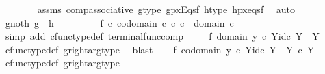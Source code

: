 \begin{isabellebody}
\ \ \ \ \ \ \isamarkupfalse%
\ assms{\isacharparenleft}{\kern0pt}{}{\isacharparenright}{\kern0pt}\ comp{\isacharunderscore}{\kern0pt}associative{}\ g{\isacharunderscore}{\kern0pt}type\ gpx{\isacharunderscore}{\kern0pt}Eqs{\isacharunderscore}{\kern0pt}f\ h{\isacharunderscore}{\kern0pt}type\ hpx{\isacharunderscore}{\kern0pt}eqs{\isacharunderscore}{\kern0pt}f\ \isamarkupfalse%
\ auto\isanewline
\ \ \isamarkupfalse%
\isanewline
\ \ \isamarkupfalse%
\ g{\isacharunderscore}{\kern0pt}not{\isacharunderscore}{\kern0pt}h{\isacharcolon}{\kern0pt}\ {\isachardoublequoteopen}g\ {\isasymnoteq}\ h{\isachardoublequoteclose}\isanewline
\ \ \isamarkupfalse%
\ {\isacharminus}{\kern0pt}\isanewline
\ \ \ \isamarkupfalse%
\ f{}{\isacharcolon}{\kern0pt}\ {\isachardoublequoteopen}{\isasymforall}c{\isachardot}{\kern0pt}\ {\isasymbeta}\isactrlbsub codomain\ c\isactrlesub \ {\isasymcirc}\isactrlsub c\ c\ {\isacharequal}{\kern0pt}\ {\isasymbeta}\isactrlbsub domain\ c\isactrlesub {\isachardoublequoteclose}\isanewline
\ \ \ \ \isamarkupfalse%
\ {\isacharparenleft}{\kern0pt}simp\ add{\isacharcolon}{\kern0pt}\ cfunc{\isacharunderscore}{\kern0pt}type{\isacharunderscore}{\kern0pt}def\ terminal{\isacharunderscore}{\kern0pt}func{\isacharunderscore}{\kern0pt}comp{\isacharparenright}{\kern0pt}\isanewline
\ \ \ \isamarkupfalse%
\ f{}{\isacharcolon}{\kern0pt}\ {\isachardoublequoteopen}domain\ {\isasymlangle}y{}\ {\isasymcirc}\isactrlsub c\ {\isasymbeta}\isactrlbsub Y\isactrlesub {\isacharcomma}{\kern0pt}id\isactrlsub c\ Y{\isasymrangle}\ {\isacharequal}{\kern0pt}\ Y{\isachardoublequoteclose}\isanewline
\ \ \ \ \isamarkupfalse%
\ cfunc{\isacharunderscore}{\kern0pt}type{\isacharunderscore}{\kern0pt}def\ g{\isacharunderscore}{\kern0pt}right{\isacharunderscore}{\kern0pt}arg{\isacharunderscore}{\kern0pt}type\ \isamarkupfalse%
\ blast\isanewline
\ \ \isamarkupfalse%
\ f{}{\isacharcolon}{\kern0pt}\ {\isachardoublequoteopen}codomain\ {\isasymlangle}y{}\ {\isasymcirc}\isactrlsub c\ {\isasymbeta}\isactrlbsub Y\isactrlesub {\isacharcomma}{\kern0pt}id\isactrlsub c\ Y{\isasymrangle}\ {\isacharequal}{\kern0pt}\ Y\ {\isasymtimes}\isactrlsub c\ Y{\isachardoublequoteclose}\isanewline
\ \ \ \ \isamarkupfalse%
\ cfunc{\isacharunderscore}{\kern0pt}type{\isacharunderscore}{\kern0pt}def\ g{\isacharunderscore}{\kern0pt}right{\isacharunderscore}{\kern0pt}arg{\isacharunderscore}{\kern0pt}type\ \isamarkupfalse%

\end{isabellebody}
